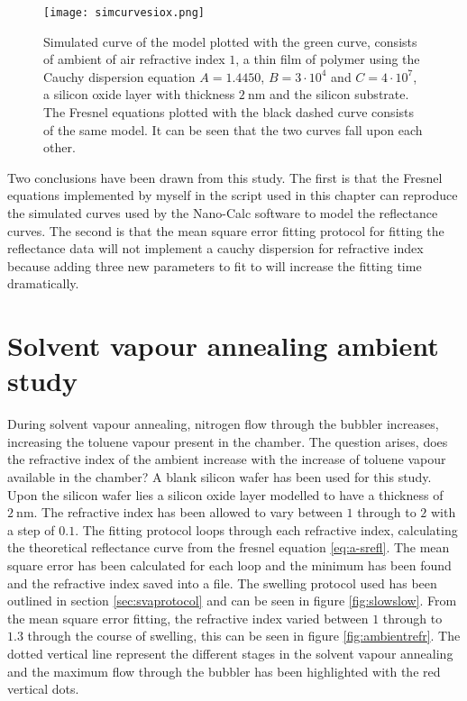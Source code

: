 \documentclass[MasterThesisMain.tex]{subfiles}
\begin{document}
\begin{figure}[H]
\centering
\texttt{[image: simcurvesiox.png]}
\caption{Simulated curve of the model plotted with the green curve, consists of ambient of air refractive index $1$, a thin film of polymer using the Cauchy dispersion equation $A=1.4450$, $B=3 \cdot 10^4$ and $C=4 \cdot 10^7$, a silicon oxide layer with thickness $\SI{2}{\nano\meter}$ and the silicon substrate. The Fresnel equations plotted with the black dashed curve consists of the same model. It can be seen that the two curves fall upon each other.}
\label{fig:simmodel2}
\end{figure}

Two conclusions have been drawn from this study. The first is that the Fresnel equations implemented by myself in the script used in this chapter can reproduce the simulated curves used by the Nano-Calc software to model the reflectance curves. The second is that the mean square error fitting protocol for fitting the reflectance data will not implement a cauchy dispersion for refractive index because adding three new parameters to fit to will increase the fitting time dramatically.    
	
\section{Solvent vapour annealing ambient study}
During solvent vapour annealing, nitrogen flow through the bubbler increases, increasing the toluene vapour present in the chamber. The question arises, does the refractive index of the ambient increase with the increase of toluene vapour available in the chamber? A blank silicon wafer has been used for this study. Upon the silicon wafer lies a silicon oxide layer modelled to have a thickness of $\SI{2}{\nano\meter}$. The refractive index has been allowed to vary between $1$ through to $2$ with a step of $0.1$. The fitting protocol loops through each refractive index, calculating the theoretical reflectance curve from the fresnel equation \ref{eq:a-srefl}. The mean square error has been calculated for each loop and the minimum has been found and the refractive index saved into a file. The swelling protocol used has been outlined in section \ref{sec:svaprotocol} and can be seen in figure \ref{fig:slowslow}. From the mean square error fitting, the refractive index varied between $1$ through to $1.3$ through the course of swelling, this can be seen in figure \ref{fig:ambientrefr}. The dotted vertical line represent the different stages in the solvent vapour annealing and the maximum flow through the bubbler has been highlighted with the red vertical dots.
\end{document}
